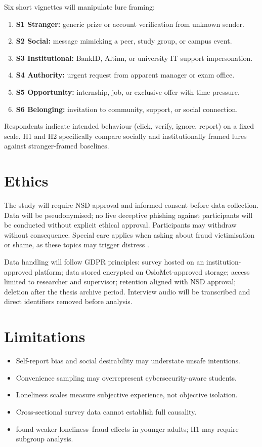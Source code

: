 \documentclass[UKenglish,12pt]{master-style}
\begin{document}
Six short vignettes will manipulate lure framing:
\begin{enumerate}
    \item \textbf{S1 Stranger:} generic prize or account verification from unknown sender.
    \item \textbf{S2 Social:} message mimicking a peer, study group, or campus event.
    \item \textbf{S3 Institutional:} BankID, Altinn, or university IT support impersonation.
    \item \textbf{S4 Authority:} urgent request from apparent manager or exam office.
    \item \textbf{S5 Opportunity:} internship, job, or exclusive offer with time pressure.
    \item \textbf{S6 Belonging:} invitation to community, support, or social connection.
\end{enumerate}

Respondents indicate intended behaviour (click, verify, ignore, report) on a fixed scale. H1 and H2 specifically compare socially and institutionally framed lures against stranger-framed baselines.

\section{Ethics}

The study will require NSD approval and informed consent before data collection. Data will be pseudonymised; no live deceptive phishing against participants will be conducted without explicit ethical approval. Participants may withdraw without consequence. Special care applies when asking about fraud victimisation or shame, as these topics may trigger distress \parencite{alves2008loneliness}.

Data handling will follow GDPR principles: survey hosted on an institution-approved platform; data stored encrypted on OsloMet-approved storage; access limited to researcher and supervisor; retention aligned with NSD approval; deletion after the thesis archive period. Interview audio will be transcribed and direct identifiers removed before analysis.

\section{Limitations}

\begin{itemize}
    \item Self-report bias and social desirability may understate unsafe intentions.
    \item Convenience sampling may overrepresent cybersecurity-aware students.
    \item Loneliness scales measure subjective experience, not objective isolation.
    \item Cross-sectional survey data cannot establish full causality.
    \item \textcite{wen2024loneliness} found weaker loneliness--fraud effects in younger adults; H1 may require subgroup analysis.
\end{itemize}
\end{document}
